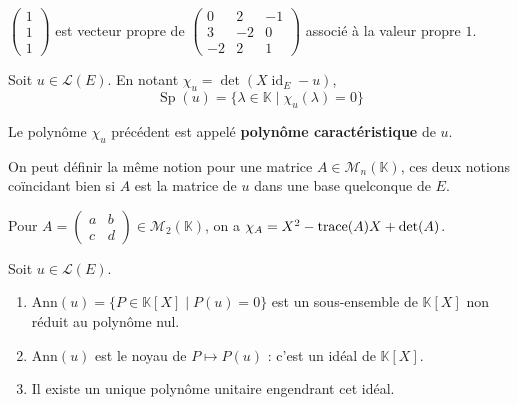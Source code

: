   \begin{example}
    $\begin{pmatrix} 1 \\ 1 \\ 1 \end{pmatrix}$ est vecteur propre de $\begin{pmatrix} 0 & 2 & -1 \\ 3 & -2 & 0 \\ -2 & 2 & 1 \end{pmatrix}$ associé à la valeur propre $1$.
  \end{example}


  \begin{proposition}
    Soit $u \in \mathcal{L}(E)$. En notant $\chi_u = \det(X \operatorname{id}_E - u)$,
    \[ \operatorname{Sp}(u) = \{ \lambda \in \mathbb{K} \mid \chi_u(\lambda) = 0 \} \]
  \end{proposition}

  \begin{definition}
    Le polynôme $\chi_u$ précédent est appelé \textbf{polynôme caractéristique} de $u$.
  \end{definition}

  \begin{remark}
    On peut définir la même notion pour une matrice $A \in \mathcal{M}_n(\mathbb{K})$, ces deux notions coïncidant bien si $A$ est la matrice de $u$ dans une base quelconque de $E$.
  \end{remark}

  \begin{example}
    Pour $A = \begin{pmatrix} a & b \\ c & d \end{pmatrix} \in \mathcal{M}_2(\mathbb{K})$, on a $\chi_A = X^2 - \operatorname{trace}(A)X + \det(A)$.
  \end{example}


  \begin{lemma}
    Soit $u \in \mathcal{L}(E)$.
    \begin{enumerate}[label={\bfseries(\roman*)}]
      \item $\mathrm{Ann}(u) = \{ P \in \mathbb{K}[X] \mid P(u) = 0 \}$ est un sous-ensemble de $\mathbb{K}[X]$ non réduit au polynôme nul.
      \item $\mathrm{Ann}(u)$ est le noyau de $P \mapsto P(u)$ : c'est un idéal de $\mathbb{K}[X]$.
      \item Il existe un unique polynôme unitaire engendrant cet idéal.
    \end{enumerate}
  \end{lemma}

